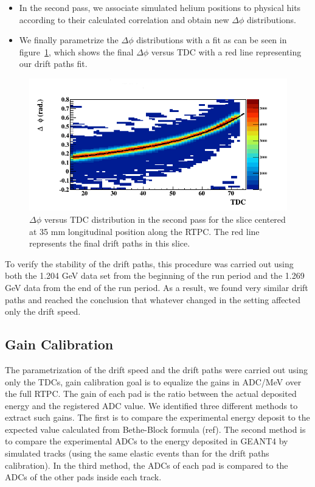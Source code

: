 \documentclass[twocolumn,showpacs,superscriptaddress,groupedaddress]{revtex4}
\begin{document}
\begin{itemize}
   \item In the second pass, we associate simulated helium positions to 
      physical hits according to their calculated correlation and obtain new 
      $\Delta \phi$ distributions.

   \item We finally parametrize the $\Delta\phi$ distributions with a fit as 
      can be seen in figure~\ref{fig:DELTA_PHI_TDC}, which shows the final 
      $\Delta \phi$ versus TDC with a red line representing our drift paths 
      fit.
\end{itemize}


\begin{figure}[tb]
\centering
\includegraphics[scale=0.37]{fig/FitResult_p2_10.png}
\caption{$\Delta \phi$ versus TDC distribution in the second pass for the slice 
centered at 35 mm longitudinal position along the RTPC. The red line represents 
the final drift paths in this slice.}
\label{fig:DELTA_PHI_TDC}
\end{figure}

To verify the stability of the drift paths, this procedure was carried out 
using both the 1.204 GeV data set from the beginning of the run period and the 
1.269 GeV data from the end of the run period. As a result, we found very 
similar drift paths and reached the conclusion that whatever changed in the 
setting affected only the drift speed.

\subsection{Gain Calibration}

The parametrization of the drift speed and the drift paths were carried out 
using only the TDCs, gain calibration goal is to equalize the gains in ADC/MeV 
over the full RTPC. The gain of each pad is the ratio between the actual 
deposited energy and the registered ADC value. We identified three different 
methods to extract such gains. The first is to compare the experimental energy 
deposit to the expected value calculated from Bethe-Block formula (ref). The 
second method is to compare the experimental ADCs to the energy deposited in 
GEANT4 by simulated tracks (using the same elastic events than for the drift 
paths calibration). In the third method, the ADCs of each pad is compared to 
the ADCs of the other pads inside each track.
\end{document}

